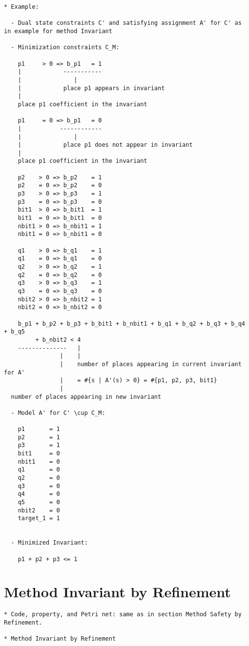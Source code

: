 \documentclass{llncs}
\begin{document}
\begin{verbatim}
* Example:

  - Dual state constraints C' and satisfying assignment A' for C' as in example for method Invariant

  - Minimization constraints C_M:

    p1     > 0 => b_p1   = 1
    |            -----------
    |               |
    |            place p1 appears in invariant
    |
    place p1 coefficient in the invariant

    p1     = 0 => b_p1   = 0
    |           ------------
    |               |
    |            place p1 does not appear in invariant
    |
    place p1 coefficient in the invariant

    p2    > 0 => b_p2    = 1
    p2    = 0 => b_p2    = 0
    p3    > 0 => b_p3    = 1
    p3    = 0 => b_p3    = 0
    bit1  > 0 => b_bit1  = 1
    bit1  = 0 => b_bit1  = 0
    nbit1 > 0 => b_nbit1 = 1
    nbit1 = 0 => b_nbit1 = 0

    q1    > 0 => b_q1    = 1
    q1    = 0 => b_q1    = 0
    q2    > 0 => b_q2    = 1
    q2    = 0 => b_q2    = 0
    q3    > 0 => b_q3    = 1
    q3    = 0 => b_q3    = 0
    nbit2 > 0 => b_nbit2 = 1
    nbit2 = 0 => b_nbit2 = 0

    b_p1 + b_p2 + b_p3 + b_bit1 + b_nbit1 + b_q1 + b_q2 + b_q3 + b_q4 + b_q5
         + b_nbit2 < 4
    --------------   |
                |    |
                |    number of places appearing in current invariant for A'
                |    = #{s | A'(s) > 0} = #{p1, p2, p3, bit1}
                |
  number of places appearing in new invariant
  
  - Model A' for C' \cup C_M:

    p1       = 1
    p2       = 1
    p3       = 1
    bit1     = 0
    nbit1    = 0
    q1       = 0
    q2       = 0
    q3       = 0
    q4       = 0
    q5       = 0
    nbit2    = 0
    target_1 = 1
    
    
  - Minimized Invariant:

    p1 + p2 + p3 <= 1
\end{verbatim}
    
\newpage

\section{Method Invariant by Refinement}

\begin{verbatim}
* Code, property, and Petri net: same as in section Method Safety by Refinement.

* Method Invariant by Refinement
\end{verbatim}
\end{document}
